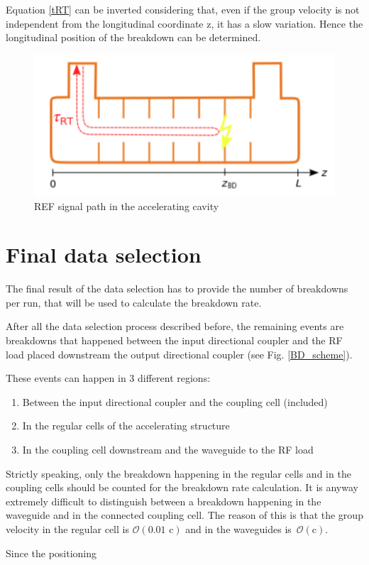 Equation \ref{tRT} can be inverted considering that, even if the group velocity is not independent from the longitudinal coordinate z, it has a slow variation. Hence the longitudinal position of the breakdown can be determined. 


\begin{figure}[h]
\centering 
\includegraphics[scale=0.3]{pictures/tToz}
\caption{REF signal path in the accelerating cavity}
\label{tToz_p}
\end{figure}




\section[Final data selection]{Final data selection}

The final result of the data selection has to provide the number of breakdowns per run, that will be used to calculate the breakdown rate. 


After all the data selection process described before, the remaining events are breakdowns that happened between the input directional coupler and the RF load placed downstream the output directional coupler (see Fig. \ref{BD_scheme}). 

These events can happen in 3 different regions:
\begin{enumerate}
\item Between the input directional coupler and the coupling cell (included)
\item In the regular cells of the accelerating structure
\item In the coupling cell downstream and the waveguide to the RF load
\end{enumerate}
Strictly speaking, only the breakdown happening in the regular cells and in the coupling cells should be counted for the breakdown rate calculation. It is anyway extremely difficult to distinguish between a breakdown happening in the waveguide and in the connected coupling cell. The reason of this is that the group velocity in the regular cell is $\mathcal{O}(\text{0.01 c})$ and in the waveguides is~$\mathcal{O}(\text{c})$. 

Since the positioning 













